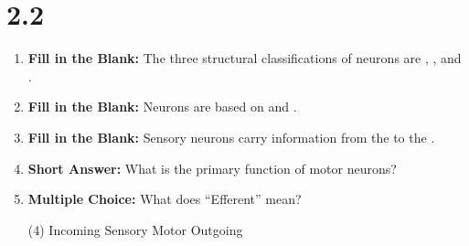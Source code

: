 \section*{2.2}
\begin{enumerate}[label=\textbf{Q2.2.\arabic*}]

      \item \textbf{Fill in the Blank:} The three structural classifications of neurons are \underline{\hspace{3cm}}, \underline{\hspace{3cm}}, and \underline{\hspace{3cm}}. \\



      \item \textbf{Fill in the Blank:} Neurons are based on \underline{\hspace{3cm}} and \underline{\hspace{3cm}}. \\


      \item \textbf{Fill in the Blank:} Sensory neurons carry information from the \underline{\hspace{3cm}} to the \underline{\hspace{3cm}}. \\

      \item \textbf{Short Answer:} What is the primary function of motor neurons? \\

      \item \textbf{Multiple Choice:} What does ``Efferent'' mean?
            \begin{tasks}[label=\textcolor{draculafg}{(\Alph*)}, item-format=\color{draculafg}, label-width=1.5em, item-indent=1.7em](4)
                  \task Incoming
                  \task Sensory
                  \task Motor
                  \task Outgoing
            \end{tasks}

\end{enumerate}
\squigglyline


